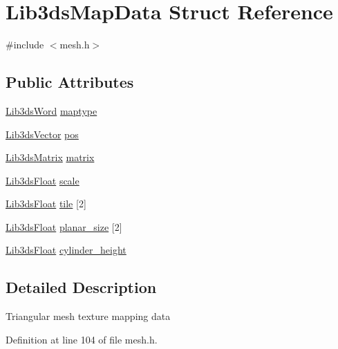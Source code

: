 \hypertarget{struct_lib3ds_map_data}{\section{Lib3ds\-Map\-Data Struct Reference}
\label{struct_lib3ds_map_data}
}


{\ttfamily \#include $<$mesh.\-h$>$}

\subsection*{Public Attributes}
\begin{DoxyCompactItemize}
\item 
\hyperlink{types_8h_a439f68d12f4ad080599044949e41dba1}{Lib3ds\-Word} \hyperlink{struct_lib3ds_map_data_a6b387e6dc4e87941c0e9646f51de8c2f}{maptype}
\item 
\hyperlink{group__vector_ga6ac1c3b3ef15381ebf6baf264d658dcf}{Lib3ds\-Vector} \hyperlink{struct_lib3ds_map_data_a98e473bbd358222ab5d461820f24d03a}{pos}
\item 
\hyperlink{group__matrix_ga6f58ff2ebfcf09ca5b5cda2f3dc1cb74}{Lib3ds\-Matrix} \hyperlink{struct_lib3ds_map_data_a1be7c131fcc6989966ad1f7153800eb8}{matrix}
\item 
\hyperlink{types_8h_ab18e70f51f9a53c9dee8d930c8e1a7bf}{Lib3ds\-Float} \hyperlink{struct_lib3ds_map_data_aa5d8a87386fb073ef9569e7d2919986a}{scale}
\item 
\hyperlink{types_8h_ab18e70f51f9a53c9dee8d930c8e1a7bf}{Lib3ds\-Float} \hyperlink{struct_lib3ds_map_data_aac604212c5a873a0954196fe73e1d2ca}{tile} \mbox{[}2\mbox{]}
\item 
\hyperlink{types_8h_ab18e70f51f9a53c9dee8d930c8e1a7bf}{Lib3ds\-Float} \hyperlink{struct_lib3ds_map_data_a6f35fc1d991c188f07f7a7c7451997e4}{planar\-\_\-size} \mbox{[}2\mbox{]}
\item 
\hyperlink{types_8h_ab18e70f51f9a53c9dee8d930c8e1a7bf}{Lib3ds\-Float} \hyperlink{struct_lib3ds_map_data_a75d5a41a547efec2dfe567bb597a4dc1}{cylinder\-\_\-height}
\end{DoxyCompactItemize}


\subsection{Detailed Description}
Triangular mesh texture mapping data 

Definition at line 104 of file mesh.\-h.




